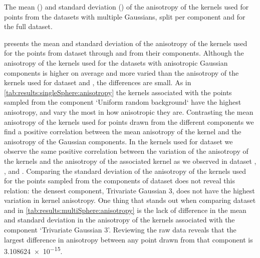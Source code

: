 	\begin{table*}
		\centering
		
		\caption{The mean (\mean) and standard deviation (\SD) of the anisotropy of the kernels used for points from the datasets with multiple Gaussians, split per component and for the full dataset.} 	
		\label{tab:results:multiSphere:anisotropy}
	\end{table*}
	 presents the mean and standard deviation of the anisotropy of the kernels used for the points from dataset \ferdosiTwo through \baakmanThree and from their components. 
	Although the anisotropy of the kernels used for the datasets with anisotropic Gaussian components is higher on average and more varied than the anisotropy of the kernels used for dataset \ferdosiTwo and \ferdosiThree, the differences are small. 
	As in \cref{tab:results:singleSphere:anisotropy} the kernels associated with the points sampled from the component `Uniform random background` have the highest anisotropy, and vary the most in how anisotropic they are. 
	Contrasting the mean anisotropy of the kernels used for points drawn from the different components we find a positive correlation between the mean anisotropy of the kernel and the anisotropy of the Gaussian components. 
		In the kernels used for dataset \baakmanTwo we observe the same positive correlation between the variation of the anisotropy of the kernels and the anisotropy of the associated kernel as we observed in dataset \baakmanOne, \baakmanFour, and \baakmanFive. 
		Comparing the standard deviation of the anisotropy of the kernels used for the points sampled from the components of dataset \baakmanThree does not reveal this relation: the densest component, Trivariate Gaussian 3, does not have the highest variation in kernel anisotropy. 
	One thing that stands out when comparing dataset \ferdosiThree and \baakmanThree in \cref{tab:results:multiSphere:anisotropy} is the lack of difference in the mean and standard deviation in the anisotropy of the kernels associated with the component `Trivariate Gaussian 3'. Reviewing the raw data reveals that the largest difference in anisotropy between any point drawn from that component is \num{3.108624e-15}.

